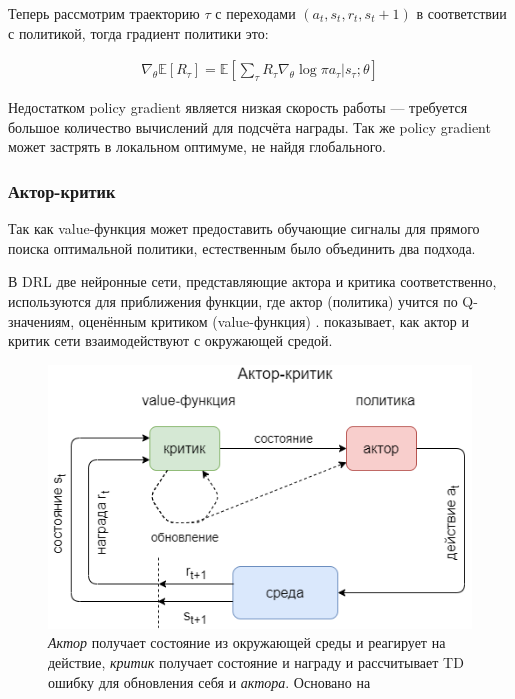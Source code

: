 Теперь рассмотрим траекторию $\tau$ с переходами $(a_t, s_t, r_t, s_t+1)$ в соответствии с политикой, тогда градиент политики это:

\begin{equation}
\label{eq:ch1-likelihood-ratios}
\begin{multlined}
\nabla_\theta \mathbb{E}[R_\tau] = \mathbb{E}[\sum_\tau R_\tau \nabla_\theta \log \pi {a_\tau|s_\tau;\theta}]
\end{multlined}
\end{equation}

Недостатком policy gradient является низкая скорость работы — требуется большое количество вычислений для подсчёта награды. Так же policy gradient может застрять в локальном оптимуме, не найдя глобального.

\subsubsection{Актор-критик}

Так как value-функция может предоставить обучающие сигналы для прямого поиска оптимальной политики, естественным было объединить два подхода.

В DRL две нейронные сети, представляющие актора и критика соответственно, используются для приближения функции, где актор (политика) учится по Q-значениям, оценённым критиком (value-функция) \cite{Arulkumaran_2017}.  показывает, как актор и критик сети взаимодействуют с окружающей средой.

\begin{figure}[ht!]
	\center
	\includegraphics [scale=0.60] {my_folder/images/ch1/RL-actor-critic.png}
	\caption{{\itshape Актор} получает состояние из окружающей среды и реагирует на действие, {\itshape критик} получает состояние и награду и рассчитывает TD ошибку для обновления себя и {\itshape актора}. Основано на \cite{Arulkumaran_2017}}
	\label{fig:ch1-RL-actor-critic}
\end{figure}

